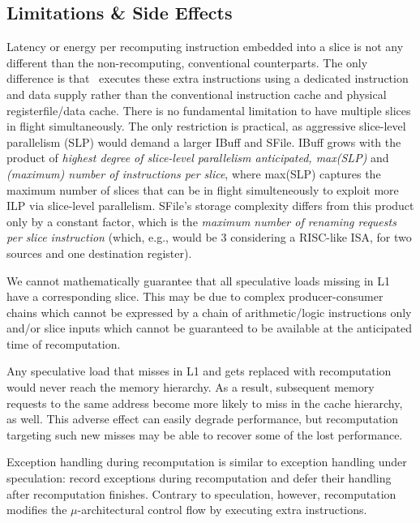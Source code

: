 \subsection{Limitations \& Side Effects}
 
 Latency or energy per recomputing instruction embedded into a slice is not any different than the non-recomputing, conventional counterparts. The only difference is that \arch\ executes these extra instructions using a dedicated instruction and data supply rather than the conventional instruction cache and physical registerfile/data cache. There is no fundamental limitation to have multiple slices  in flight simultaneously. The only restriction is practical, as aggressive slice-level parallelism (SLP) would demand a larger IBuff and SFile. 
 IBuff grows with the product of {\em highest degree of slice-level parallelism anticipated, max(SLP)} and {\em (maximum) number of instructions per slice}, where max(SLP) captures the maximum number of slices that can be in flight simulteneously to exploit more ILP via slice-level parallelism. SFile's storage complexity differs from this product only by a constant factor, which is the {\em maximum number of renaming requests per slice instruction} (which, e.g., would be 3 considering a RISC-like ISA, for two sources and one destination register).

 We cannot mathematically guarantee that all speculative loads missing in L1 have a corresponding slice. This may be due to complex producer-consumer chains which cannot be expressed by a chain of arithmetic/logic instructions only and/or slice inputs which cannot be guaranteed to be available at the anticipated time of recomputation. 
 
Any speculative load that misses in L1 and gets replaced with recomputation would never reach the memory hierarchy. As a result, subsequent memory requests to the same address become more likely to miss in the cache hierarchy, as well. This adverse effect can easily degrade performance, but recomputation targeting such new misses may be able to recover some of the lost performance.
 
Exception handling during recomputation is similar to exception handling
under speculation: record exceptions during recomputation and defer their handling after recomputation finishes.
Contrary to speculation, however, recomputation modifies the $\mu$-architectural control flow by executing extra
instructions.  

